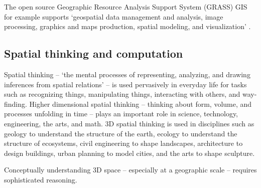 %
%


The open source 
Geographic Resource Analysis Support System (GRASS) GIS for example supports 
`geospatial data management and analysis, image processing, graphics and maps production, spatial modeling, and visualization' \cite{GRASS_GIS_software}. 



\subsection{Spatial thinking and computation} %
Spatial thinking -- `the mental processes of representing, analyzing, and drawing inferences from spatial relations' \cite{Uttal2013} -- is used pervasively in everyday life for tasks such as recognizing things, manipulating things, interacting with others, and way-finding. 
% 
Higher dimensional spatial thinking 
-- thinking about form, volume, and processes unfolding in time -- 
plays an important role in 
science, technology, engineering, the arts, and math. 
%
3D spatial thinking is used in disciplines 
such as geology to understand the structure of the earth, 
ecology to understand the structure of ecosystems, 
civil engineering to shape landscapes, 
architecture to design buildings,
urban planning to model cities,
and the arts to shape sculpture.

Conceptually understanding 3D space 
-- especially at a geographic scale --
requires sophisticated reasoning.
%


